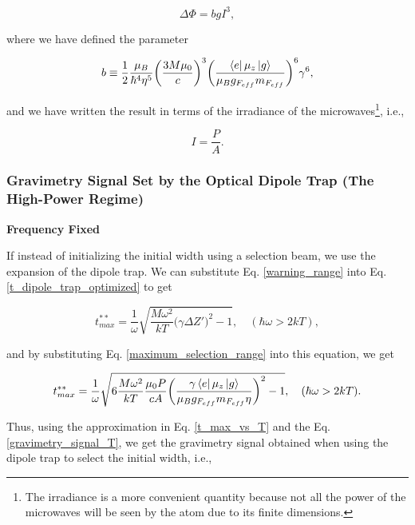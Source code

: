 \documentclass{article}
\begin{document}
\begin{equation}\label{gravimetry_signal_irradiance}
    \Delta \Phi = b g I^3, 
\end{equation}

where we have defined the parameter

\begin{equation}
    b \equiv \frac{1}{2} \frac{ \mu_{B}}{ \hbar^{4} \eta^{5}} \bigg(\frac{3M \mu_{0}}{c} \bigg)^{3} \bigg(\frac{\bra{e} \mu_{z} \ket{g}}{\mu_{B} g_{F_{eff}} m_{F_{eff}}} \bigg)^{6} \gamma^6,
\end{equation}

and we have written the result in terms of the irradiance of the microwaves\footnote{The irradiance is a more convenient quantity because not all the power of the microwaves will be seen by the atom due to its finite dimensions.}, i.e.,

\begin{equation}
    I = \frac{P}{A}.
\end{equation}

\subsubsection{Gravimetry Signal Set by the Optical Dipole Trap (The High-Power Regime)}
\textbf{Frequency Fixed}

If instead of initializing the initial width using a selection beam, we use the expansion of the dipole trap. We can substitute Eq. \ref{warning_range} into Eq. \ref{t_dipole_trap_optimized} to get

\begin{equation}
        t^{**}_{max} = \frac{1}{\omega} \sqrt{\frac{M \omega^{2}}{kT} \bigg( \gamma \Delta Z' \bigg)^{2} - 1}, \quad (\hbar \omega > 2kT),
\end{equation}

and by substituting Eq. \ref{maximum_selection_range} into this equation, we get

\begin{equation}
        t^{**}_{max} = \frac{1}{\omega} \sqrt{6 \frac{M \omega^{2}}{kT} \frac{\mu_{0} P}{ c A} \bigg(\frac{ \gamma  \bra{e} \mu_{z} \ket{g}}{\mu_{B} g_{F_{eff}} m_{F_{eff}} \eta}\bigg)^{2} - 1}, \quad (\hbar \omega > 2kT).
\end{equation}

Thus, using the approximation in Eq. \ref{t_max_vs_T} and the Eq. \ref{gravimetry_signal_T}, we get the gravimetry signal obtained when using the dipole trap to select the initial width, i.e.,
\end{document}
